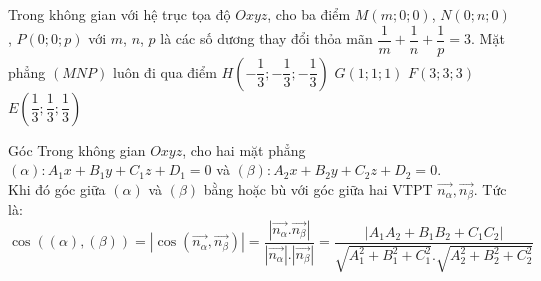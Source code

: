 \begin{ex}%
	Trong không gian với hệ trục tọa độ $Oxyz$, cho ba điểm $M(m;0;0)$, $N(0;n;0)$, $P(0;0;p)$ với $m$, $n$, $p$ là các số dương thay đổi thỏa mãn $\dfrac{1}{m}+\dfrac{1}{n}+\dfrac{1}{p}=3$. Mặt phẳng $(MNP)$ luôn đi qua điểm
	\choice
	{$H\left(-\dfrac{1}{3};-\dfrac{1}{3};-\dfrac{1}{3}\right)$}
	{$G(1;1;1)$}
	{$F(3;3;3)$}
	{\True $E\left(\dfrac{1}{3};\dfrac{1}{3};\dfrac{1}{3}\right)$}
\end{ex}



\begin{dang}{Góc}
Trong không gian $Oxyz$, cho hai mặt phẳng $\left(\alpha\right):A_1x+B_1y+C_1z+D_1=0$ và $\left(\beta\right):A_2x+B_2y+C_2z+D_2=0 $.\\
Khi đó góc giữa $\left(\alpha\right)$ và $\left(\beta\right)$ bằng hoặc bù với góc giữa hai VTPT $\overrightarrow{n_{\alpha}},\overrightarrow{n_{\beta}}$. Tức là:\\
$$\boxed{ \cos\left(\left(\alpha\right),\left(\beta\right)\right)=\left|\cos\left(\overrightarrow{n_{\alpha}},\overrightarrow{n_\beta}\right)\right|=\dfrac{\left|\overrightarrow{n_{\alpha}}.\overrightarrow{n_{\beta}}\right|}{\left|\overrightarrow{n_{\alpha}}\right|.\left|\overrightarrow{n_{\beta}}\right|}=\dfrac{\left|A_1A_2+B_1B_2+C_1C_2\right|}{\sqrt{A_1^2+B_1^2+C_1^2}.\sqrt{A_2^2+B_2^2+C_2^2}}}$$
	
\end{dang}
\setcounter{subsubsection}{0}
\setcounter{vd}{0}
\setcounter{bt}{0}
\setcounter{ex}{0}
